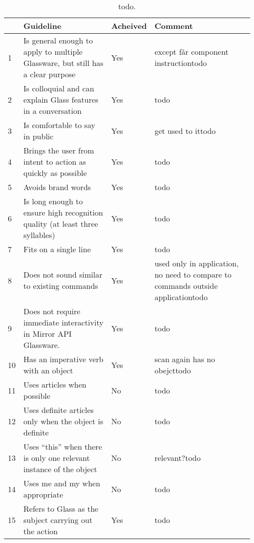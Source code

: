 	\begin{table}[ht!]
    		\caption{todo.} \label{tab:voiceCommandCheckTableChecked}
		\centering \begin{tabularx}{\textwidth}{l|X|l|X} \hline
		 & \textbf{Guideline} & \textbf{Acheived} & \textbf{Comment} \\ \hline \hline
       
1	&	Is general enough to apply to multiple Glassware, but still has a clear purpose		&	Yes		&	except får component instructiontodo		\\ \hline
2	&	Is colloquial and can explain Glass features in a conversation					&	Yes		&	todo		\\ \hline
3	&	Is comfortable to say in public											&	Yes		&	get used to ittodo		\\ \hline
4	&	Brings the user from intent to action as quickly as possible					&	Yes		&	todo		\\ \hline
5	&	Avoids brand words													&	Yes		&	todo		\\ \hline
6	&	Is long enough to ensure high recognition quality (at least three syllables)			&	Yes		&	todo		\\ \hline
7	&	Fits on a single line													&	Yes		&	todo		\\ \hline
8	&	Does not sound similar to existing commands								&	Yes		&	used only in application, no need to compare to commands outside applicationtodo		\\ \hline
9	&	Does not require immediate interactivity in Mirror API Glassware.				&	Yes		&	todo		\\ \hline
10	&	Has an imperative verb with an object									&	Yes		&	scan again has no obejcttodo		\\ \hline
11	&	Uses articles when possible											&	No		&	todo		\\ \hline
12	&	Uses definite articles only when the object is definite							&	No		& 	todo		\\ \hline
13	&	Uses ``this'' when there is only one relevant instance of the object				&	No		&	relevant?todo		\\ \hline
14	&	Uses me and my when appropriate										&	No		&	todo		\\ \hline
15	&	Refers to Glass as the subject carrying out the action						&	Yes		&	todo		\\ \hline
		
		\end{tabularx}
	\end{table}